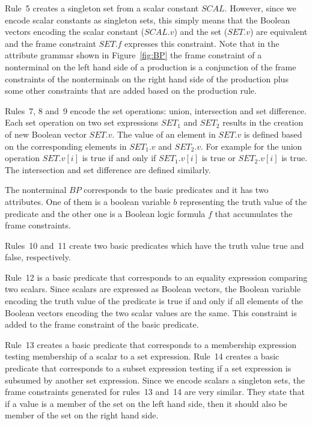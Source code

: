 Rule~5 creates a singleton set from a scalar constant $SCAL$.
However, since we encode scalar constants as singleton sets, this
simply means that the Boolean vectors encoding the scalar constant
($SCAL.v$) and the set ($SET.v$) are equivalent and the frame
constraint $SET.f$ expresses this constraint.  Note that in the
attribute grammar shown in Figure~\ref{fig:BP} the frame constraint of
a nonterminal on the left hand side of a production is a conjunction
of the frame constraints of the nonterminals on the right hand side of
the production plus some other constraints that are added based on the
production rule.

Rules~7, 8 and~9 encode the set operations: union, intersection and
set difference.  Each set operation on two set expressions $SET_1$ and
$SET_2$ results in the creation of new Boolean vector $SET.v$.  The
value of an element in $SET.v$ is defined based on the corresponding
elements in $SET_1.v$ and $SET_2.v$.  For example for the union
operation $SET.v[i]$ is true if and only if $SET_1.v[i]$ is true or
$SET_2.v[i]$ is true.  The intersection and set difference are defined
similarly.

The nonterminal $BP$ corresponds to the basic predicates and it has
two attributes. One of them is a boolean variable $b$ representing
the truth value of the predicate and the other one is a
Boolean logic formula $f$ that accumulates the frame constraints.

Rules~10 and~11 create two basic predicates which have the truth value
true and false, respectively.

Rule~12 is a basic predicate that corresponds to an equality
expression comparing two scalars.  Since scalars are expressed as
Boolean vectors, the Boolean variable encoding the truth value of the
predicate is true if and only if all elements of the Boolean vectors
encoding the two scalar values are the same.  This constraint is added
to the frame constraint of the basic predicate.

Rule~13 creates a basic predicate that corresponds to a membership
expression testing membership of a scalar to a set expression.
Rule~14 creates a basic predicate that corresponds to a subset
expression testing if a set expression is subsumed by another set
expression.  Since we encode scalars a singleton sets, the frame
constraints generated for rules~13 and~14 are very similar.  They
state that if a value is a member of the set on the left hand side,
then it should also be member of the set on the right hand side.


